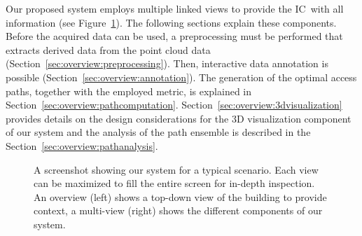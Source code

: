\documentclass[conference,10pt,letter]{IEEEtran}
\def\IC{IC}
\begin{document}
Our proposed system employs multiple linked views to provide the \IC\ with all information (see Figure~\ref{sec:overview:system}). The following sections explain these components. Before the acquired data can be used, a preprocessing must be performed that extracts derived data from the point cloud data (Section~\ref{sec:overview:preprocessing}). Then, interactive data annotation is possible (Section~\ref{sec:overview:annotation}). The generation of the optimal access paths, together with the employed metric, is explained in Section~\ref{sec:overview:pathcomputation}. Section~\ref{sec:overview:3dvisualization} provides details on the design considerations for the 3D visualization component of our system and the analysis of the path ensemble is described in the Section~\ref{sec:overview:pathanalysis}.

\begin{figure}
    \centering
    \caption{A screenshot showing our system for a typical scenario. Each view can be maximized to fill the entire screen for in-depth inspection. An overview (left) shows a top-down view of the building to provide context, a multi-view (right) shows the different components of our system.}
    \label{sec:overview:system}
\end{figure}
\end{document}
